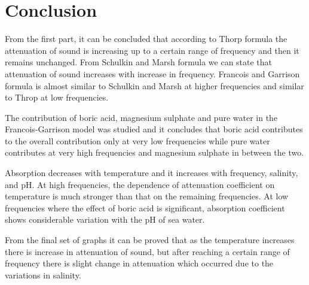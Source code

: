 \chapter{Conclusion} \label{Conclusion}

\noindent From the first part, it can be concluded that according to Thorp formula the attenuation of sound is increasing up to a certain range of frequency and then it remains unchanged. From Schulkin and Marsh formula we can state that attenuation of sound increases with increase in frequency. Francois and Garrison formula is almost similar to Schulkin and Marsh at higher frequencies and similar to Throp at low frequencies.

\noindent The contribution of boric acid, magnesium sulphate and pure water in the Francois-Garrison model was studied and it concludes that boric acid contributes to the overall contribution only at very low frequencies while pure water contributes at very high frequencies and magnesium sulphate in between the two.

\noindent Absorption decreases with temperature and it increases with frequency, salinity, and pH. At high
frequencies, the dependence of  attenuation coefficient on temperature is much stronger than that on the remaining frequencies. At low frequencies where the effect of boric acid is significant, absorption coefficient shows considerable variation with the pH of sea water. 

\noindent From the final set of graphs it can be proved that as the temperature increases there is increase in attenuation of sound, but after reaching a certain range of frequency there is slight change in attenuation which occurred due to the variations in salinity.
